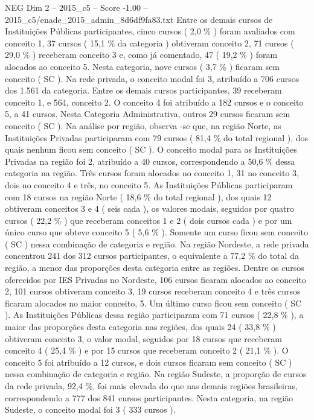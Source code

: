 \begin{textsample}{NEG Dim 2 – 2015\_c5 – Score -1.00 – 2015\_c5/enade\_2015\_admin\_8d6df9fa83.txt}
Entre os demais cursos de Instituições Públicas participantes, cinco cursos ( 2,0 \% ) foram avaliados com conceito 1, 37 cursos ( 15,1 \% da categoria ) obtiveram conceito 2, 71 cursos ( 29,0 \% ) receberam conceito 3 e, como já comentado, 47 ( 19,2 \% ) foram alocados ao conceito 5.
Nesta categoria, nove cursos ( 3,7 \% ) ficaram sem conceito ( SC ).
Na rede privada, o conceito modal foi 3, atribuído a 706 cursos dos 1.561 da categoria.
Entre os demais cursos participantes, 39 receberam conceito 1, e 564, conceito 2.
O conceito 4 foi atribuído a 182 cursos e o conceito 5, a 41 cursos.
Nesta Categoria Administrativa, outros 29 cursos ficaram sem conceito ( SC ).
Na análise por região, observa -se que, na região Norte, as Instituições Privadas participaram com 79 cursos ( 81,4 \% do total regional ), dos quais nenhum ficou sem conceito ( SC ).
O conceito modal para as Instituições Privadas na região foi 2, atribuído a 40 cursos, correspondendo a 50,6 \% dessa categoria na região.
Três cursos foram alocados no conceito 1, 31 no conceito 3, dois no conceito 4 e três, no conceito 5.
As Instituições Públicas participaram com 18 cursos na região Norte ( 18,6 \% do total regional ), dos quais 12 obtiveram conceitos 3 e 4 ( seis cada ), os valores modais, seguidos por quatro cursos ( 22,2 \% ) que receberam conceitos 1 e 2 ( dois cursos cada ) e por um único curso que obteve conceito 5 ( 5,6 \% ).
Somente um curso ficou sem conceito ( SC ) nessa combinação de categoria e região.
Na região Nordeste, a rede privada concentrou 241 dos 312 cursos participantes, o equivalente a 77,2 \% do total da região, a menor das proporções desta categoria entre as regiões.
Dentre os cursos oferecidos por IES Privadas no Nordeste, 106 cursos ficaram alocados ao conceito 2, 101 cursos obtiveram conceito 3, 19 cursos receberam conceito 4 e três cursos ficaram alocados no maior conceito, 5.
Um último curso ficou sem conceito ( SC ).
As Instituições Públicas dessa região participaram com 71 cursos ( 22,8 \% ), a maior das proporções desta categoria nas regiões, dos quais 24 ( 33,8 \% ) obtiveram conceito 3, o valor modal, seguidos por 18 cursos que receberam conceito 4 ( 25,4 \% ) e por 15 cursos que receberam conceito 2 ( 21,1 \% ).
O conceito 5 foi atribuído a 12 cursos, e dois cursos ficaram sem conceito ( SC ) nessa combinação de categoria e região.
Na região Sudeste, a proporção de cursos da rede privada, 92,4 \%, foi mais elevada do que nas demais regiões brasileiras, correspondendo a 777 dos 841 cursos participantes.
Nesta categoria, na região Sudeste, o conceito modal foi 3 ( 333 cursos ).

\end{textsample}

